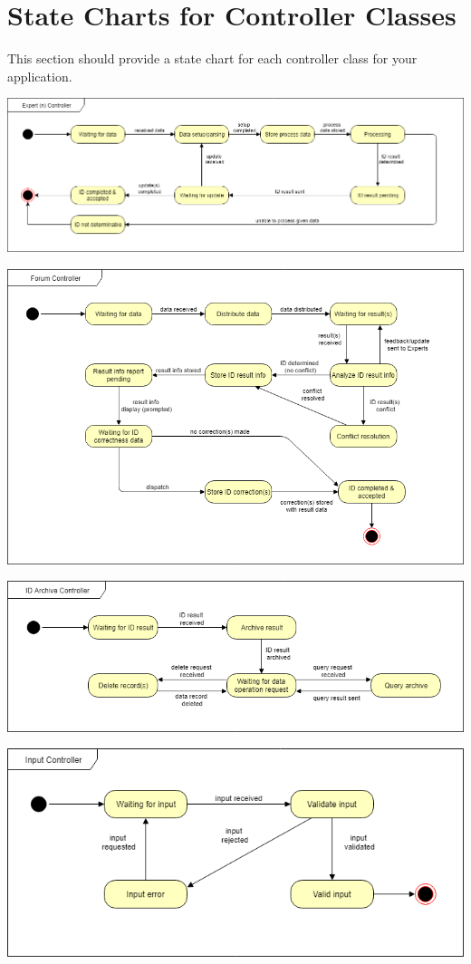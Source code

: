 \documentclass[]{article}
\begin{document}
\newpage
\section{State Charts for Controller Classes}
\label{sec:state_charts_for_controller_classes}
This section should provide a state chart for each controller class for your application.
\begin{center}
\includegraphics[scale=0.5]{ExpertnController}
\end{center}
\begin{center}
\includegraphics[scale=0.5]{ForumController}
\end{center}
\begin{center}
\includegraphics[scale=0.5]{IDArchiveController}
\end{center}
\begin{center}
\includegraphics[scale=0.5]{InputController}
\end{center}
\end{document}
